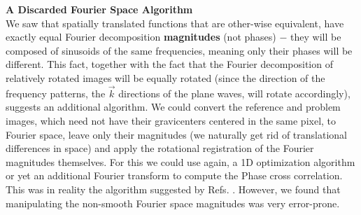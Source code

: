 \documentclass[11pt, a4paper, twoside]{article} %
\DeclareRobustCommand{\mybox}[2][gray!10]{%
\begin{tcolorbox}[   %
        left=0.2cm,
        right=0.2cm,
        top=0.15cm,
        bottom=0.15cm,
        colback=#1,
        colframe=#1,
        width=\dimexpr\textwidth\relax, 
        enlarge left by=0mm,
        boxsep=5pt,
        arc=0pt,outer arc=0pt,
        ]
        #2
\end{tcolorbox}
}
\begin{document}

\mybox{{\bf A Discarded Fourier Space Algorithm\vspace{0.13cm} \\}
We saw that spatially translated functions that are other-wise equivalent, have exactly equal Fourier decomposition {\bf magnitudes} (not phases) $-$ they will be composed of sinusoids of the same frequencies, meaning only their phases will be different. This fact, together with the fact that the Fourier decomposition of relatively rotated images will be equally rotated (since the direction of the frequency patterns, the $\vec{k}$ directions of the plane waves, will rotate accordingly), suggests an additional algorithm. We could convert the reference and problem images, which need not have their gravicenters centered in the same pixel, to Fourier space, leave only their magnitudes (we naturally get rid of translational differences in space) and apply the rotational registration of the Fourier magnitudes themselves. For this we could use again, a 1D optimization algorithm or yet an additional Fourier transform to compute the Phase cross correlation. This was in reality the algorithm suggested by Refs. \cite{phase,phase2}. However, we found that manipulating the non-smooth Fourier space magnitudes was very error-prone.
}
\end{document}
